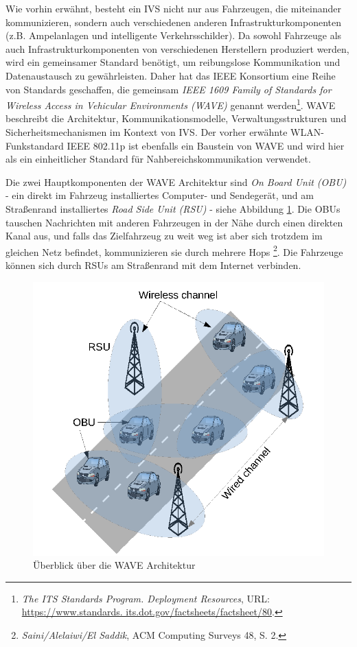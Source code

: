 Wie vorhin erwähnt, besteht ein IVS nicht nur aus Fahrzeugen, die miteinander kommunizieren, sondern auch verschiedenen anderen Infrastrukturkomponenten (z.B. Ampelanlagen und intelligente Verkehrsschilder). Da sowohl Fahrzeuge als auch Infrastrukturkomponenten von verschiedenen Herstellern produziert werden, wird ein gemeinsamer Standard benötigt, um reibungslose Kommunikation und Datenaustausch zu gewährleisten. Daher hat das IEEE Konsortium eine Reihe von Standards geschaffen, die gemeinsam \emph{IEEE 1609 Family of Standards for Wireless Access in Vehicular Environments (WAVE)} genannt werden\footnote{\emph{The ITS Standards Program. Deployment Resources}, URL: \url{ https://www.standards. its.dot.gov/factsheets/factsheet/80}.}\nocite{WAVE}. WAVE beschreibt die Architektur, Kommunikationsmodelle, Verwaltungsstrukturen und Sicherheitsmechanismen im Kontext von IVS. Der vorher erwähnte WLAN-Funkstandard IEEE 802.11p ist ebenfalls ein Baustein von WAVE und wird hier als ein einheitlicher Standard für Nahbereichskommunikation verwendet. 

Die zwei Hauptkomponenten der WAVE Architektur sind \emph{On Board Unit (OBU)} - ein direkt im Fahrzeug installiertes Computer- und Sendegerät, und am Straßenrand installiertes \emph{Road Side Unit (RSU)} - siehe Abbildung \ref{fig:vanet}. Die OBUs tauschen Nachrichten mit anderen Fahrzeugen in der Nähe durch einen direkten Kanal aus, und falls das Zielfahrzeug zu weit weg ist aber sich trotzdem im gleichen Netz befindet, kommunizieren sie durch mehrere Hops \footnote{\emph{Saini/Alelaiwi/El Saddik}, ACM Computing Surveys 48, S. 2.}\nocite{VANET}. Die Fahrzeuge können sich durch RSUs am Straßenrand mit dem Internet verbinden.

\begin{figure}
	\centering
	\includegraphics[width=0.7\linewidth]{images/VANET}
	\caption[Überblick über die WAVE Architektur]{Überblick über die WAVE Architektur\footnotemark \nocite{VANET}}
	\label{fig:vanet}
\end{figure}

